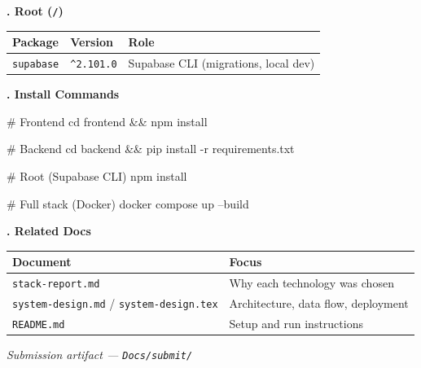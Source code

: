 \documentclass[11pt,a4paper]{article}
\newcommand{\pkg}[1]{\texttt{#1}}
\newcommand{\semver}[1]{\texttt{\textasciicircum#1}}
\newcommand{\sectiontitle}[1]{%
  \vspace{0.9em}%
  \noindent
  \colorbox{sectiontitlebg}{%
    \parbox{\dimexpr\linewidth-2\fboxsep}{%
      \vspace{6pt}%
      {\fontsize{18}{22}\bfseries\selectfont #1}%
      \vspace{6pt}%
    }%
  }%
  \par\vspace{0.55em}%
}
\begin{document}
\sectiontitle{5. Root (\texttt{/})}

\begin{center}
\small
\renewcommand{\arraystretch}{1.25}
\begin{tabularx}{\linewidth}{@{}L{2.8cm} R{1.8cm} X@{}}
\toprule
\textbf{Package} & \textbf{Version} & \textbf{Role} \\
\midrule
\pkg{supabase} & \semver{2.101.0} & Supabase CLI (migrations, local dev) \\
\bottomrule
\end{tabularx}
\end{center}

\sectiontitle{6. Install Commands}

\begin{codeblock}
# Frontend
cd frontend && npm install

# Backend
cd backend && pip install -r requirements.txt

# Root (Supabase CLI)
npm install

# Full stack (Docker)
docker compose up --build
\end{codeblock}

\sectiontitle{7. Related Docs}

\begin{center}
\small
\renewcommand{\arraystretch}{1.25}
\begin{tabularx}{\linewidth}{@{}L{4.2cm} X@{}}
\toprule
\textbf{Document} & \textbf{Focus} \\
\midrule
\pkg{stack-report.md} & Why each technology was chosen \\
\pkg{system-design.md} / \pkg{system-design.tex} & Architecture, data flow, deployment \\
\pkg{README.md} & Setup and run instructions \\
\bottomrule
\end{tabularx}
\end{center}

\vfill
\begin{center}
{\footnotesize\itshape Submission artifact --- \pkg{Docs/submit/}}
\end{center}
\end{document}
